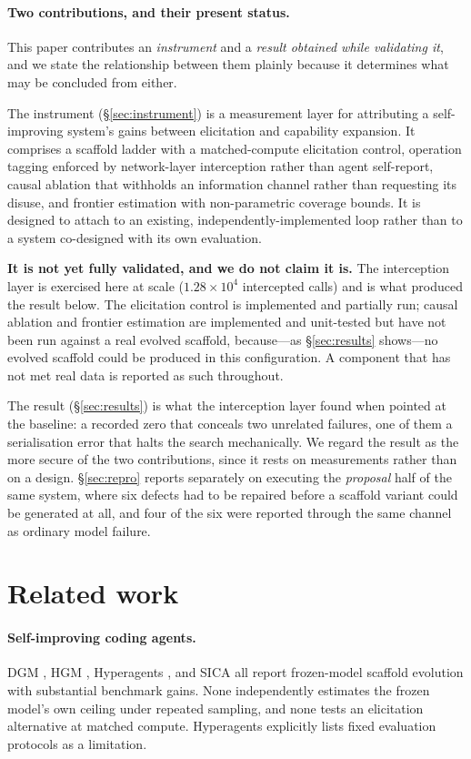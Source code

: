\documentclass{article}
\begin{document}
\paragraph{Two contributions, and their present status.}
This paper contributes an \emph{instrument} and a \emph{result obtained
while validating it}, and we state the relationship between them plainly
because it determines what may be concluded from either.

The instrument (\S\ref{sec:instrument}) is a measurement layer for
attributing a self-improving system's gains between elicitation and
capability expansion. It comprises a scaffold ladder with a matched-compute
elicitation control, operation tagging enforced by network-layer
interception rather than agent self-report, causal ablation that withholds
an information channel rather than requesting its disuse, and frontier
estimation with non-parametric coverage bounds. It is designed to attach to
an existing, independently-implemented loop rather than to a system
co-designed with its own evaluation.

\textbf{It is not yet fully validated, and we do not claim it is.} The
interception layer is exercised here at scale ($1.28\times10^4$ intercepted
calls) and is what produced the result below. The elicitation control is
implemented and partially run; causal ablation and frontier estimation are
implemented and unit-tested but have not been run against a real evolved
scaffold, because---as \S\ref{sec:results} shows---no evolved scaffold could
be produced in this configuration. A component that has not met real data is
reported as such throughout.

The result (\S\ref{sec:results}) is what the interception layer found when
pointed at the baseline: a recorded zero that conceals two unrelated
failures, one of them a serialisation error that halts the search
mechanically. We regard the result as the more secure of the two
contributions, since it rests on measurements rather than on a design.
\S\ref{sec:repro} reports separately on executing the \emph{proposal} half
of the same system, where six defects had to be repaired before a scaffold
variant could be generated at all, and four of the six were reported through
the same channel as ordinary model failure.

\section{Related work}

\paragraph{Self-improving coding agents.}
DGM \citep{zhang2025dgm}, HGM \citep{qin2025hgm}, Hyperagents
\citep{zhang2026hyperagents}, and SICA \citep{robeyns2025sica} all report
frozen-model scaffold evolution with substantial benchmark gains. None
independently estimates the frozen model's own ceiling under repeated sampling,
and none tests an elicitation alternative at matched compute. Hyperagents
explicitly lists fixed evaluation protocols as a limitation.
\end{document}

